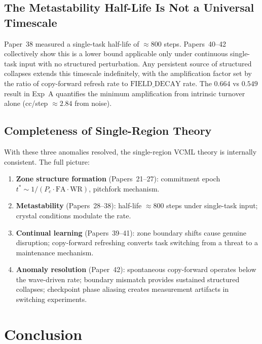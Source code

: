 \documentclass[11pt]{article}
\begin{document}
\subsection{The Metastability Half-Life Is Not a Universal Timescale}

Paper~38 measured a single-task half-life of $\approx 800$ steps.
Papers~40--42 collectively show this is a lower bound applicable only under
continuous single-task input with no structured perturbation.
Any persistent source of structured collapses extends this timescale
indefinitely, with the amplification factor set by the ratio of
copy-forward refresh rate to $\mathrm{FIELD\_DECAY}$ rate.
The $0.664$ vs $0.549$ result in Exp~A quantifies the minimum amplification
from intrinsic turnover alone (cc/step $\approx 2.84$ from noise).

\subsection{Completeness of Single-Region Theory}

With these three anomalies resolved, the single-region VCML theory is
internally consistent.
The full picture:
\begin{enumerate}
  \item \textbf{Zone structure formation} (Papers~21--27):
        commitment epoch $t^* \sim 1/(P_c \cdot \mathrm{FA} \cdot \mathrm{WR})$,
        pitchfork mechanism.
  \item \textbf{Metastability} (Papers~28--38):
        half-life $\approx 800$ steps under single-task input;
        crystal conditions modulate the rate.
  \item \textbf{Continual learning} (Papers~39--41):
        zone boundary shifts cause genuine disruption; copy-forward refreshing
        converts task switching from a threat to a maintenance mechanism.
  \item \textbf{Anomaly resolution} (Paper~42):
        spontaneous copy-forward operates below the wave-driven rate;
        boundary mismatch provides sustained structured collapses;
        checkpoint phase aliasing creates measurement artifacts in switching
        experiments.
\end{enumerate}

\section{Conclusion}
\end{document}
